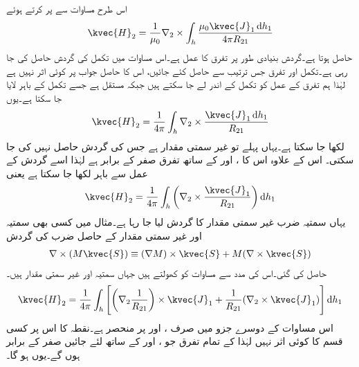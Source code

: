 اس طرح مساوات  سے  پر کرتے ہوئے
\begin{align*}
\kvec{H}_2=\frac{1}{\mu_0} \nabla_2 \times \int_h \frac{\mu_0 \kvec{J}_1 \dif h_1}{4\pi R_{21}}
\end{align*}
حاصل ہوتا ہے۔گردش  بنیادی طور پر تفرق کا عمل ہے۔اس مساوات میں تکمل کی گردش حاصل کی جا رہی ہے۔تکمل اور تفرق جس ترتیب سے حاصل کئے جائیں، اس کا حاصل جواب پر کوئی اثر نہیں ہے لہٰذا ہم تفرق کے عمل کو تکمل کے اندر لے جا سکتے ہیں جبکہ  مستقل ہے جسے تکمل کے باہر لایا جا سکتا ہے۔یوں
\begin{align*}
\kvec{H}_2=\frac{1}{4\pi}  \int_h \nabla_2 \times\frac{ \kvec{J}_1 \dif h_1}{ R_{21}}
\end{align*}
لکھا جا سکتا ہے۔یہاں  پہلے تو غیر سمتی مقدار ہے جس کی گردش حاصل نہیں کی جا سکتی۔ اس کے علاوہ اس کا ،  اور  کے ساتھ تفرق صفر کے برابر ہے لہٰذا اسے گردش کے عمل سے  باہر لکھا جا سکتا ہے یعنی
\begin{align}\label{مساوات_مقناطیسی_گردش_ثبوت_الف}
\kvec{H}_2=\frac{1}{4\pi}  \int_h \left(\nabla_2 \times\frac{ \kvec{J}_1}{ R_{21}}\right) \dif h_1
\end{align}
یہاں سمتیہ  ضرب غیر سمتی مقدار  کا گردش لیا جا رہا ہے۔مثال  میں کسی بھی سمتیہ  اور غیر سمتی مقدار  کے حاصل ضرب کی گردش
\begin{align}
\nabla \times (M \kvec{S}) \equiv (\nabla M) \times \kvec{S} +M(\nabla \times \kvec{S})
\end{align}
حاصل کی گئی۔اس کی مدد سے مساوات  کو کھولتے ہیں جہاں سمتیہ  اور غیر سمتی مقدار  ہیں۔
\begin{align}\label{مساوات_مقناطیسی_گردش_ثبوت_ب}
\kvec{H}_2=\frac{1}{4\pi}  \int_h  \left[ \left(\nabla_2 \frac{1}{R_{21}}\right) \times \kvec{J}_1 +\frac{1}{R_{21}} (\nabla_2 \times \kvec{J}_1) \right]\dif h_1
\end{align}
اس مساوات کے دوسرے جزو میں  صرف ،  اور  پر منحصر ہے۔نقطہ  کا اس پر کسی قسم  کا کوئی اثر نہیں لہٰذا  کے تمام تفرق جو ،  اور  کے ساتھ لئے جائیں صفر کے برابر ہوں گے۔یوں  ہو گا۔

